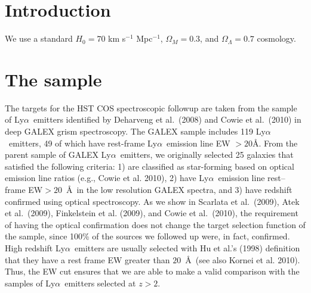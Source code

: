 \documentclass[manuscript]{emulateapj}
\newcommand{\lya}{Ly$\alpha$}
\begin{document}

\begin{abstract}
 \end{abstract}



\section{Introduction}
We use a standard $H_0 = 70$ km s$^{-1}$ Mpc$^{-1}$, $\Omega_M = 0.3$,
and $\Omega_\Lambda = 0.7$ cosmology.

\section{The sample}
The targets for the HST COS spectroscopic followup are taken from the
sample of \lya\ emitters identified by Deharveng et al.\ (2008) and
Cowie et al.\ (2010) in deep GALEX grism spectroscopy. The GALEX
sample includes 119 \lya\ emitters, 49 of which have rest-frame \lya\
emission line EW $>20$\AA.  From the parent sample of GALEX \lya\
emitters, we originally selected 25 galaxies that satisfied the
following criteria: 1) are classified as star-forming based on optical
emission line ratios (e.g., Cowie et al. 2010), 2) have \lya\ emission
line rest--frame EW$>20$~\AA\ in the low resolution GALEX spectra, and
3) have redshift confirmed using optical spectroscopy.  As we show in
Scarlata et al.\ (2009), Atek et al.\ (2009), Finkelstein et
al. (2009), and Cowie et al.\ (2010), the requirement of having the
optical confirmation does not change the target selection function of
the sample, since 100\% of the sources we followed up were, in fact,
confirmed.  %
High redshift \lya\ emitters are usually selected with Hu et al.'s
(1998) definition that they have a rest frame EW greater than
$20$~\AA\ (see also Kornei et al. 2010). Thus, the EW cut ensures that
we are able to make a valid comparison with the samples of \lya\
emitters selected at $z>2$. 
\end{document}
